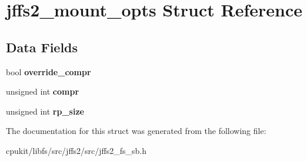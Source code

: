 \hypertarget{structjffs2__mount__opts}{}\section{jffs2\+\_\+mount\+\_\+opts Struct Reference}
\label{structjffs2__mount__opts}
\subsection*{Data Fields}
\begin{DoxyCompactItemize}
\item 
\mbox{\label{structjffs2__mount__opts_af851dfcb8ce769fa07c7a0bbd28e39bc}} 
bool {\bfseries override\+\_\+compr}
\item 
\mbox{\label{structjffs2__mount__opts_a3112009f024943bcfe472c390f168aaa}} 
unsigned int {\bfseries compr}
\item 
\mbox{\label{structjffs2__mount__opts_ac9d0b6eea211df9a94be77df5af8e0b1}} 
unsigned int {\bfseries rp\+\_\+size}
\end{DoxyCompactItemize}


The documentation for this struct was generated from the following file\+:\begin{DoxyCompactItemize}
\item 
cpukit/libfs/src/jffs2/src/jffs2\+\_\+fs\+\_\+sb.\+h\end{DoxyCompactItemize}
